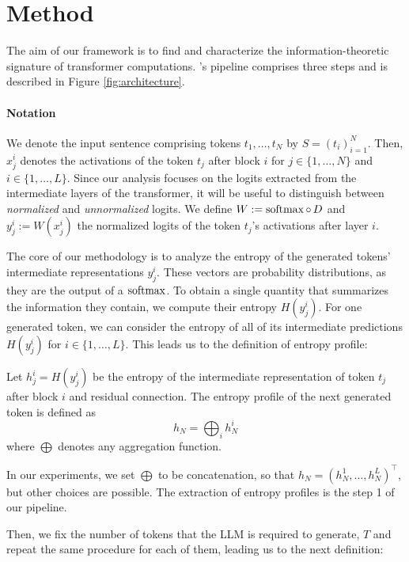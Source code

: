 \section{Method} \label{sec:method}
The aim of our framework is to find and characterize the information-theoretic signature of transformer computations. \entropylens's pipeline comprises three steps and is described in Figure \ref{fig:architecture}.

\paragraph{Notation} We denote the input sentence comprising tokens $t_1,\dots, t_N$ by $S=(t_i)_{i=1}^N$. Then, $x_j^i$ denotes the activations of the token $t_j$ after block $i$ for $j\in\{1,\dots,N\}$ and $i\in\{1,\dots,L\}$. Since our analysis focuses on the logits extracted from the intermediate layers of the transformer, it will be useful to distinguish between \textit{normalized} and \textit{unnormalized} logits. We define $W:=\operatorname{softmax}\circ\, D$ and $y_j^i:=W(x_j^i)$ the normalized logits of the token $t_j$'s activations after layer $i$.


The core of our methodology is to analyze the entropy of the generated tokens' intermediate representations $y_j^i$. These vectors are probability distributions, as they are the output of a $\operatorname{softmax}$. To obtain a single quantity that summarizes the information they contain, we compute their entropy $H(y_j^i)$. For one generated token, we can consider the entropy of all of its intermediate predictions $H(y_j^i)$ for $i\in\{1,\dots,L\}$. This leads us to the definition of entropy profile:

\begin{definition}\label{def:entropy-profile}
    Let $h_j^i=H(y_j^i)$ be the entropy of the intermediate representation of token $t_j$ after block $i$ and residual connection. The entropy profile of the next generated token is defined as
    \begin{equation}
        h_N = \bigoplus_i h_N^i
    \end{equation}
    where $\bigoplus$ denotes any aggregation function.
\end{definition}
In our experiments, we set $\bigoplus$ to be concatenation, so that $h_N=(h_N^1,\dots,h_N^L)^\top$, but other choices are possible. The extraction of entropy profiles is the step 1 of our pipeline.

Then, we fix the number of tokens that the LLM is required to generate, $T$ and repeat the same procedure for each of them, leading us to the next definition:

